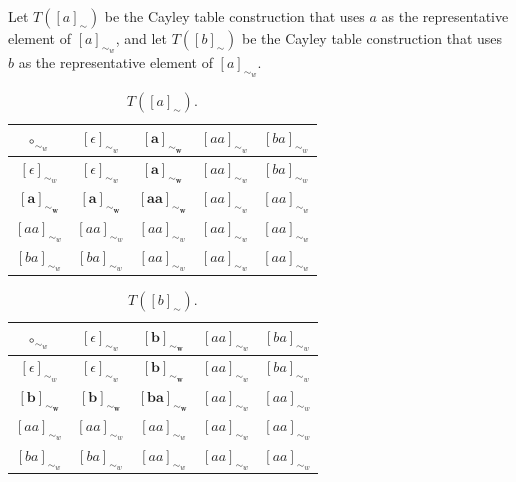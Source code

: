 \begin{proofE}
\begin{enumerate}[(1)]
    Let $T([a]_{\sim})$ be the Cayley table construction that uses $a$ as the representative element of $[a]_{\sim_{w}}$, and let $T([b]_{\sim})$ be the Cayley table construction that uses $b$ as the representative element of $[a]_{\sim_{w}}$.
    \begin{table}[H]
        \centering
        \begin{tabular}{c|cccc}
            $\circ_{\sim_{w}}$              & $[\epsilon]_{\sim_{w}}$     & $\bm{[a]_{\sim_{w}}}$   & $[aa]_{\sim_{w}}$   & $[ba]_{\sim_{w}}$ \\
            \hline
            $[\epsilon]_{\sim_{w}}$        & $[\epsilon]_{\sim_{w}}$      & $\bm{[a]_{\sim_{w}}}$    & $[aa]_{\sim_{w}}$   & $[ba]_{\sim_{w}}$ \\
            $\bm{[a]_{\sim_{w}}}$          & $\bm{[a]_{\sim_{w}}}$        & $\bm{[aa]_{\sim_{w}}}$   & $[aa]_{\sim_{w}}$   & $[aa]_{\sim_{w}}$ \\
            $[aa]_{\sim_{w}}$              & $[aa]_{\sim_{w}}$            & $[aa]_{\sim_{w}}$   & $[aa]_{\sim_{w}}$   & $[aa]_{\sim_{w}}$ \\
            $[ba]_{\sim_{w}}$              & $[ba]_{\sim_{w}}$            & $[aa]_{\sim_{w}}$   & $[aa]_{\sim_{w}}$   & $[aa]_{\sim_{w}}$ \\
        \end{tabular}
        \caption{
        $T([a]_{\sim})$.
        }
    \end{table}
    \begin{table}[H]
        \centering
        \begin{tabular}{c|cccc}
            $\circ_{\sim_{w}}$              & $[\epsilon]_{\sim_{w}}$     & $\bm{[b]_{\sim_{w}}}$   & $[aa]_{\sim_{w}}$   & $[ba]_{\sim_{w}}$ \\
            \hline
            $[\epsilon]_{\sim_{w}}$        & $[\epsilon]_{\sim_{w}}$      & $\bm{[b]_{\sim_{w}}}$    & $[aa]_{\sim_{w}}$   & $[ba]_{\sim_{w}}$ \\
            $\bm{[b]_{\sim_{w}}}$          & $\bm{[b]_{\sim_{w}}}$        & $\bm{[ba]_{\sim_{w}}}$ & $[aa]_{\sim_{w}}$ & $[aa]_{\sim_{w}}$ \\
            $[aa]_{\sim_{w}}$              & $[aa]_{\sim_{w}}$            & $[aa]_{\sim_{w}}$   & $[aa]_{\sim_{w}}$   & $[aa]_{\sim_{w}}$ \\
            $[ba]_{\sim_{w}}$              & $[ba]_{\sim_{w}}$            & $[aa]_{\sim_{w}}$   & $[aa]_{\sim_{w}}$   & $[aa]_{\sim_{w}}$ \\
        \end{tabular}
        \caption{
        $T([b]_{\sim})$.
        }
    \end{table}
    

\end{enumerate}
\end{proofE}
